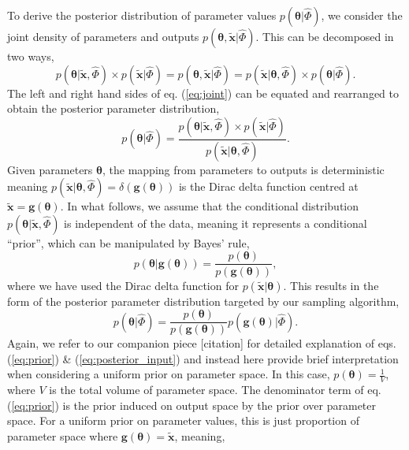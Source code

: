 \documentclass[10pt,letterpaper]{article}
\begin{document}
To derive the posterior distribution of parameter values $p(\boldsymbol{\theta}|\hat{\Phi})$, we consider the joint density of parameters and outputs $p(\boldsymbol{\theta},\tilde{\boldsymbol{x}}|\hat{\Phi})$. This can be decomposed in two ways, 
%
\begin{equation}\label{eq:joint}
p(\boldsymbol{\theta}|\tilde{\boldsymbol{x}}, \hat{\Phi}) \times p(\tilde{\boldsymbol{x}}|\hat{\Phi}) = p(\boldsymbol{\theta},\tilde{\boldsymbol{x}}|\hat{\Phi}) =  p(\tilde{\boldsymbol{x}}| \boldsymbol{\theta}, \hat{\Phi}) \times p(\boldsymbol{\theta}|\hat{\Phi}).
\end{equation}
%
The left and right hand sides of eq. (\ref{eq:joint}) can be equated and rearranged to obtain the posterior parameter distribution,
%
\begin{equation}
p(\boldsymbol{\theta}|\hat{\Phi}) = \frac{p(\boldsymbol{\theta}|\tilde{\boldsymbol{x}}, \hat{\Phi}) \times p(\tilde{\boldsymbol{x}}|\hat{\Phi})}{p(\tilde{\boldsymbol{x}}| \boldsymbol{\theta}, \hat{\Phi})}.
\end{equation}
%
Given parameters $\boldsymbol{\theta}$, the mapping from parameters to outputs is deterministic meaning $p(\tilde{\boldsymbol{x}}| \boldsymbol{\theta}, \hat{\Phi})=\delta(\boldsymbol{g}(\boldsymbol{\theta}))$ is the Dirac delta function centred at $\tilde{\boldsymbol{x}}=\boldsymbol{g}(\boldsymbol{\theta})$. In what follows, we assume that the conditional distribution $p(\boldsymbol{\theta}|\tilde{\boldsymbol{x}}, \hat{\Phi})$ is independent of the data, meaning it represents a conditional ``prior'', which can be manipulated by Bayes' rule,
%
\begin{equation}\label{eq:prior}
p(\boldsymbol{\theta}|\boldsymbol{g}(\boldsymbol{\theta})) = \frac{p(\boldsymbol{\theta})}{p(\boldsymbol{g}(\boldsymbol{\theta}))},
\end{equation}
%
where we have used the Dirac delta function for $p(\tilde{\boldsymbol{x}}|\boldsymbol{\theta})$. This results in the form of the posterior parameter distribution targeted by our sampling algorithm,
%
\begin{equation}\label{eq:posterior_input}
p(\boldsymbol{\theta}|\hat{\Phi}) = \frac{p(\boldsymbol{\theta})}{p(\boldsymbol{g}(\boldsymbol{\theta}))} p(\boldsymbol{g}(\boldsymbol{\theta})|\hat{\Phi}).
\end{equation}
%
Again, we refer to our companion piece [citation] for detailed explanation of eqs. (\ref{eq:prior}) \& (\ref{eq:posterior_input}) and instead here provide brief interpretation when considering a uniform prior on parameter space. In this case, $p(\boldsymbol{\theta}) = \frac{1}{V}$, where $V$ is the total volume of parameter space. The denominator term of eq. (\ref{eq:prior}) is the prior induced on output space by the prior over parameter space. For a uniform prior on parameter values, this is just proportion of parameter space where $\boldsymbol{g}(\boldsymbol{\theta}) = \tilde{\boldsymbol{x}}$, meaning,
\end{document}
